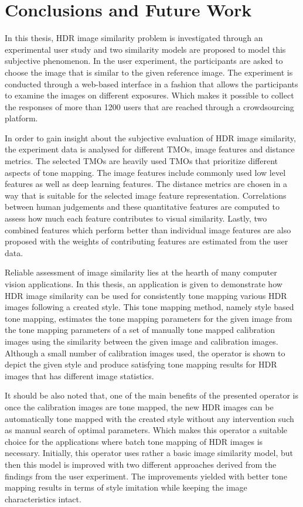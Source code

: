 \chapter{Conclusions and Future Work}
\label{chp:b7}

In this thesis, HDR image similarity problem is investigated through an experimental user study and two similarity models are proposed to model this subjective phenomenon. In the user experiment, the participants are asked to choose the image that is similar to the given reference image. The experiment is conducted through a web-based interface in a fashion that allows the participants to examine the images on different exposures. Which makes it possible to collect the responses of more than 1200 users that are reached through a crowdsourcing platform.

In order to gain insight about the subjective evaluation of HDR image similarity, the experiment data is analysed for different TMOs, image features and distance metrics. The selected TMOs are heavily used TMOs that prioritize different aspects of tone mapping. The image features include commonly used low level features as well as deep learning features. The distance metrics are chosen in a way that is suitable for the selected image feature representation. Correlations between human judgements and these quantitative features are computed to assess how much each feature contributes to visual similarity. Lastly, two combined features which perform better than individual image features are also proposed with the weights of contributing features are estimated from the user data.

Reliable assessment of image similarity lies at the hearth of many computer vision applications. In this thesis, an application is given to demonstrate how HDR image similarity can be used for consistently tone mapping various HDR images following a created style. This tone mapping method, namely style based tone mapping, estimates the tone mapping parameters for the given image from the tone mapping parameters of a set of manually tone mapped calibration images using the similarity between the given image and calibration images. Although a small number of calibration images used, the operator is shown to depict the given style and produce satisfying tone mapping results for HDR images that has different image statistics. 

It should be also noted that, one of the main benefits of the presented operator is once the calibration images are tone mapped, the new HDR images can be automatically tone mapped with the created style without any intervention such as manual search of optimal parameters. Which makes this operator a suitable choice for the applications where batch tone mapping of HDR images is necessary. Initially, this operator uses rather a basic image similarity model, but then this model is improved with two different approaches derived from the findings from the user experiment. The improvements yielded with better tone mapping results in terms of style imitation while keeping the image characteristics intact. 

